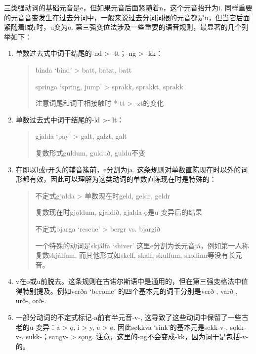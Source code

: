 三类强动词的基础元音是e，但如果元音后面紧随着n，这个元音抬升为i.
同样重要的元音音变发生在过去分词中，一般来说过去分词词根的元音都是u，但当它后面紧随着l或r时，u变为o.
第三强变位法涉及一些重要的语音规则，最显著的几个列举如下：

\begin{enumerate}
    \item
          单数过去式中词干结尾的-nd > -tt；-ng > -kk：

          \begin{quote}
              binda `bind‌' > batt, batzt, batt

              springa `spring, jump‌' > sprakk, sprakkt, sprakk

              注意词尾和词干相接触时 *-tt > -zt的变化
          \end{quote}
    \item
          单数过去式中词干结尾的-ld >- lt：

          \begin{quote}
              gjalda `pay‌' > galt, galzt, galt

              复数形式guldum, gulduð, guldu不变
          \end{quote}

    \item
          在即以l或r开头的辅音簇前，e分割为ja.
          这条规则对单数直陈现在时以外的词形都有效，因此可以理解为这类动词的单数直陈现在时是特殊的：

          \begin{quote}
              不定式gjalda > 单数现在时geld, geldr, geldr

              复数现在时gjǫldum, gjaldið, gjalda ǫ是u-变异后的结果

              不定式bjarga `rescue‌' > bergr vs. bjargið

              一个特殊的动词是skjálfa `shiver‌'
              这里e分割为长元音já，例如第一人称复数skjálfum, 而其他形式如skelf, skalf,
              skulfum, skolfinn等没有长元音。
          \end{quote}
    \item
          v在o或u前脱去。这条规则在古诺尔斯语中是通用的，但在第三强变格法中值得特别提及。例如verða
          `become‌' 的四个基本元的词干分别是verð-, varð-, urð-, orð-.
    \item
          一部分动词的不定式标记-a前有半元音-v-, 这导致了这些动词中保留了一些古老的u-变异：a > ǫ, i > y, e > ø. 因此søkkva
          `sink‌'的基本元是sekk-v-, sǫkk-v-, sukk-；sangv- > sǫng.
          注意，这里的-ng不会变成-kk，因为词干是包括-v-的。
\end{enumerate}




